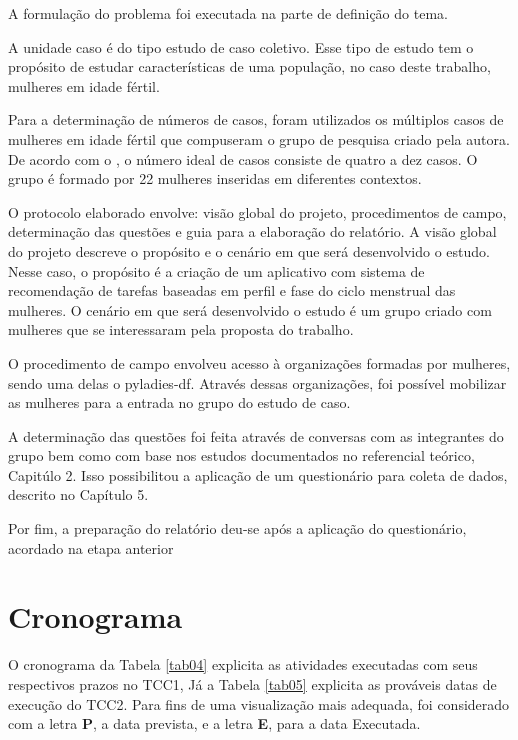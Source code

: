 A formulação do problema foi executada na parte de definição do tema.

A unidade caso é do tipo estudo de caso coletivo. Esse tipo de estudo tem o propósito de estudar características
de uma população, no caso deste trabalho, mulheres em idade fértil.

Para a determinação de números de casos, foram utilizados os múltiplos casos de mulheres em idade fértil que compuseram o grupo de pesquisa criado pela autora. De acordo com o , 
o número ideal de casos consiste de quatro a dez casos. O grupo é formado por 22 mulheres inseridas em diferentes contextos.

O protocolo elaborado envolve: visão global do projeto, procedimentos de campo, determinação das questões e guia para a elaboração do relatório.
A visão global do projeto descreve o propósito e o cenário em que será desenvolvido o estudo. Nesse caso, o propósito é a criação de um aplicativo com sistema de recomendação de tarefas baseadas 
em perfil e fase do ciclo menstrual das mulheres. O cenário em que será desenvolvido o estudo é um grupo criado com mulheres que se interessaram pela proposta do trabalho.

O procedimento de campo envolveu acesso à organizações formadas por mulheres, sendo uma delas o pyladies-df. Através dessas organizações, foi possível mobilizar as mulheres 
para a entrada no grupo do estudo de caso.

A determinação das questões foi feita através de conversas com as 
integrantes do grupo bem como com base nos estudos documentados no 
referencial teórico, Capitúlo 2. Isso possibilitou a aplicação de 
um questionário para coleta de dados, descrito no Capítulo 5.

Por fim, a preparação do relatório deu-se após a aplicação do questionário, acordado na etapa anterior
\section{Cronograma}

O cronograma da Tabela \ref{tab04} explicita as atividades executadas com seus respectivos prazos no TCC1, Já a Tabela \ref{tab05} 
explicita as prováveis datas de execução do TCC2.
Para fins de uma visualização mais adequada, foi considerado com a letra \textbf{P}, a
data prevista, e a letra \textbf{E}, para a data Executada.

